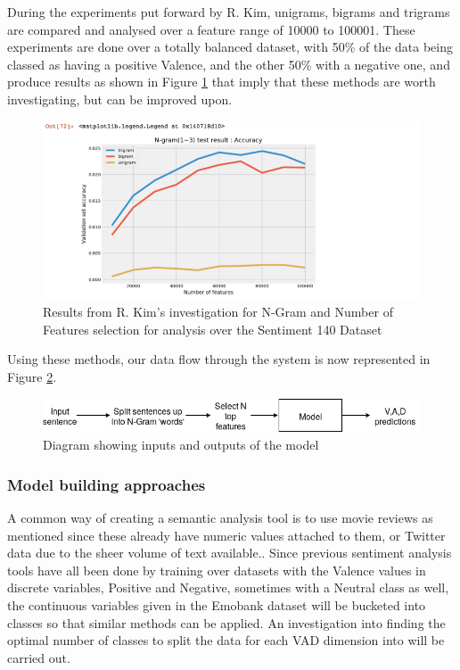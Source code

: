During the experiments put forward by R. Kim, unigrams, bigrams and trigrams are compared and analysed over a feature range of 10000 to 100001. These experiments are done over a totally balanced dataset, with 50\% of the data being classed as having a positive Valence, and the other 50\% with a negative one, and produce results as shown in Figure \ref{towards:DS} that imply that these methods are worth investigating, but can be improved upon.

\begin{figure}[h]
\centering
\includegraphics[scale=0.5]{litImgs/towardsDSNgramNFeatures.png}
\caption{Results from R. Kim's investigation for N-Gram and Number of Features selection for analysis over the Sentiment 140 Dataset \cite{go2016sentiment140}}
\label{towards:DS}
\end{figure}

Using these methods, our data flow through the system is now represented in Figure \ref{model:flow}.

\begin{figure}[h]
\centering
\includegraphics[scale=0.5]{litImgs/modelFlow.png}
\caption{Diagram showing inputs and outputs of the model}
\label{model:flow}
\end{figure}


\pagebreak

\subsubsection{Model building approaches}

A common way of creating a semantic analysis tool is to use movie reviews as mentioned since these already have numeric values attached to them, or Twitter data due to the sheer volume of text available.. Since previous sentiment analysis tools have all been done by training over datasets with the Valence values in discrete variables, Positive and Negative, sometimes with a Neutral class as well, the continuous variables given in the Emobank dataset will be bucketed into classes so that similar methods can be applied. An investigation into finding the optimal number of classes to split the data for each VAD dimension into will be carried out.

